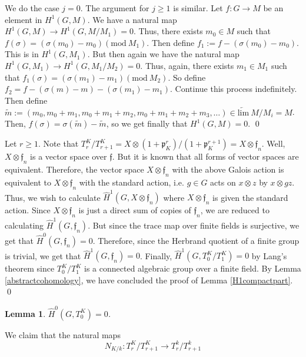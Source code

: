 \documentclass[11pt]{amsart}
\theoremstyle{plain}
\newtheorem{lemma}[theorem]{Lemma}
\theoremstyle{definition}
\begin{document}
\proof

We do the case $j = 0$.  The argument for $j \geq 1$ is similar.  Let
$f : G \rightarrow M$ be an element in $H^1(G,M)$.  We have a natural
map $H^1(G, M ) \rightarrow H^1(G, M / M_1) = 0$.  Thus, there exists
$m_0 \in M$ such that $f(\sigma) = (\sigma(m_0) - m_0) (\mathrm{mod} \
M_1)$.  Then define $f_1 := f - (\sigma(m_0) - m_0)$.  This is in
$H^1(G, M_1)$. But then again we have the natural map
$H^1(G, M_1) \rightarrow H^1(G, M_1 / M_2) = 0$.  Thus, again, there
exists $m_1 \in M_1$ such that $f_1(\sigma) = (\sigma(m_1) - m_1) (\mathrm{mod} \ M_2)$.
So define $f_2 = f - (\sigma(m) - m) - (\sigma(m_1) - m_1)$.  Continue
this process indefinitely.  Then define
$\tilde{m} := (m_0, m_0 + m_1, m_0 + m_1 + m_2, m_0 + m_1 + m_2
+ m_3, \ldots) \in \underleftarrow{\mathrm{lim}} \ M / M_i = M$.  Then,
$f(\sigma) = \sigma(\tilde{m}) - \tilde{m}$, so we get finally that
$H^1(G,M) = 0$.  \qed

Let $r \geq 1$.  Note that $T_r^K / T_{r+1}^K = X \otimes (1 +
\mathfrak{p}_K^r) / (1 + \mathfrak{p}_K^{r+1}) = X \otimes
\mathfrak{f}_n$.  Well, $X \otimes \mathfrak{f}_n$ is a vector space
over $\mathfrak{f}$.  But it is known that all forms of vector spaces
are equivalent.  Therefore, the vector space $X \otimes
\mathfrak{f}_n$ with the above Galois action is equivalent to $X
\otimes \mathfrak{f}_n$ with the standard action, i.e. $g \in G$ acts
on $x \otimes z$ by $x \otimes gz$.  Thus, we wish to calculate
$\hat{H}^1(G, X \otimes \mathfrak{f}_n)$ where $X \otimes
\mathfrak{f}_n$ is given the standard action.  Since $X \otimes
\mathfrak{f}_n$ is just a direct sum of copies of $\mathfrak{f}_n$, we
are reduced to calculating $\hat{H}^1(G, \mathfrak{f}_n)$.  But since
the trace map over finite fields is surjective, we get that
$\hat{H}^0(G, \mathfrak{f}_n) = 0$.  Therefore, since the Herbrand
quotient of a finite group is trivial, we get that $\hat{H}^1(G,
\mathfrak{f}_n) = 0$.  Finally, $\hat{H}^1(G, T_0^K / T_1^K) = 0$ by
Lang's theorem since $T_0^K / T_1^K$ is a connected algebraic group
over a finite field.  By Lemma \ref{abstractcohomology}, we have
concluded the proof of Lemma \ref{H1compactpart}.  \qed

\begin{lemma}\label{H0compactpart}
$\hat{H}^0(G,T_0^K) = 0$.
\end{lemma}

\proof
We claim that the natural maps
$$N_{K/k} : T_r^K / T_{r+1}^K \rightarrow T_r^k / T_{r+1}^k$$
\end{document}
